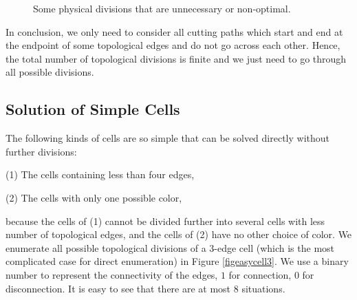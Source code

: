 \documentclass[journal]{IEEEtran}
\begin{document}
\begin{figure}[t]
\centering
{}
\caption{Some physical divisions that are unnecessary or non-optimal. }\label{figproof}
\end{figure}

In conclusion, we only need to consider all cutting paths which start and end at the endpoint of some topological edges and do not go across each other. Hence, the total number of topological divisions is finite and we just need to go through all possible divisions. 


\subsection{Solution of Simple Cells}
The following kinds of cells are so simple that can be solved directly without further divisions:

(1) The cells containing less than four edges,

(2) The cells with only one possible color,

\noindent
because the cells of (1) cannot be divided further into several cells with less number of topological edges, and the cells of (2) have no other choice of color. We enumerate all possible topological divisions of a 3-edge cell (which is the most complicated case for direct enumeration) in Figure \ref{figeasycell3}. We use a binary number to represent the connectivity of the edges, $1$ for connection, $0$ for disconnection. It is easy to see that there are at most $8$ situations.
\end{document}
